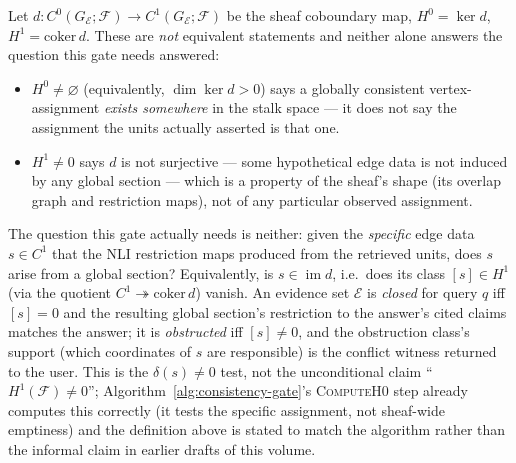 \begin{definition}
\label{def:closure-cohomological}
Let $d: C^0(G_{\mathcal{E}}; \mathcal{F}) \to C^1(G_{\mathcal{E}}; \mathcal{F})$ be the sheaf coboundary map, $H^0 = \ker d$, $H^1 = \mathrm{coker}\, d$. These are \emph{not} equivalent statements and neither alone answers the question this gate needs answered:
\begin{itemize}
  \item $H^0 \neq \varnothing$ (equivalently, $\dim \ker d > 0$) says a globally consistent vertex-assignment \emph{exists somewhere} in the stalk space --- it does not say the assignment the units actually asserted is that one.
  \item $H^1 \neq 0$ says $d$ is not surjective --- some hypothetical edge data is not induced by any global section --- which is a property of the sheaf's shape (its overlap graph and restriction maps), not of any particular observed assignment.
\end{itemize}
The question this gate actually needs is neither: given the \emph{specific} edge data $s \in C^1$ that the NLI restriction maps produced from the retrieved units, does $s$ arise from a global section? Equivalently, is $s \in \operatorname{im} d$, i.e.\ does its class $[s] \in H^1$ (via the quotient $C^1 \twoheadrightarrow \mathrm{coker}\,d$) vanish. An evidence set $\mathcal{E}$ is \emph{closed} for query $q$ iff $[s] = 0$ and the resulting global section's restriction to the answer's cited claims matches the answer; it is \emph{obstructed} iff $[s] \neq 0$, and the obstruction class's support (which coordinates of $s$ are responsible) is the conflict witness returned to the user. This is the $\delta(s) \neq 0$ test, not the unconditional claim ``$H^1(\mathcal{F}) \neq 0$''; Algorithm~\ref{alg:consistency-gate}'s \textsc{ComputeH0} step already computes this correctly (it tests the specific assignment, not sheaf-wide emptiness) and the definition above is stated to match the algorithm rather than the informal claim in earlier drafts of this volume.
\end{definition}

